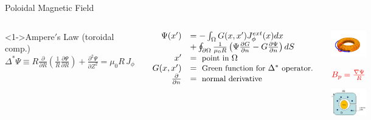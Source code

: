\documentclass{beamer}
\begin{document}
\begin{frame}{Poloidal Magnetic Field}
\begin{columns}
\begin{block}<1->{Ampere$'$s Law { \small (toroidal comp.)}}
{ \small $ \Delta^* \Psi \equiv R \frac{\partial }{\partial R} (\frac{1}{R}  \frac{\partial \Psi }{\partial R} )  +
	\frac{\partial ^2 \Psi }{\partial Z^2}  = \mu_0 R \, J_\phi $  }
\end{block}

	$ \begin{array}{rl}
	  \Psi (x') &= - \int_\Omega G(x,x') J_\phi^{ext} (x) d x  \\
	  	&+ \oint_{\partial \Omega} \frac{1}{\mu_0 R} \left ( \Psi  \frac{\partial G }{\partial n}
		 - G \frac{\partial \Psi }{\partial n} \right ) dS \\
		x' &= \textrm{ \small point in } \Omega \\
		G(x,x')  &= \textrm{ \small  Green function for } \Delta^* \textrm{ \small operator.} \\
		 \frac{\partial  }{\partial n}   &= \textrm{ \small normal derivative}
	 \end{array} $

	\begin{center}
		\includegraphics[width=.7\columnwidth]{torsurf.png}

		$\color{red} B_{p} = \frac{\nabla \Psi}{R} $

		\includegraphics[width=.55\columnwidth]{xsection.png}
	\end{center}
\end{columns}
\end{frame}
\end{document}
